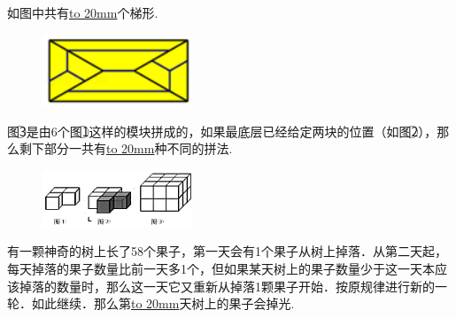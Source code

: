 \item {
    如图中共有\underline{\hbox to 20mm{}}个梯形.
    \begin{figure}[H] 
        \centering
        \includegraphics[width=0.4\textwidth]{./pics/Chapter_6/2016_1.png}
    \end{figure}
}

\item {
    图\textcircled{3}是由6个图\textcircled{1}这样的模块拼成的，如果最底层已经给定两块的位置（如图\textcircled{2}），那么剩下部分一共有\underline{\hbox to 20mm{}}种不同的拼法.
    \begin{figure}[H] 
        \centering
        \includegraphics[width=0.4\textwidth]{./pics/Chapter_6/2016_2.png}
    \end{figure}
}

\item {
    有一颗神奇的树上长了58个果子，第一天会有1个果子从树上掉落．从第二天起，每天掉落的果子数量比前一天多1个，但如果某天树上的果子数量少于这一天本应该掉落的数量时，那么这一天它又重新从掉落1颗果子开始．按原规律进行新的一轮．如此继续．那么第\underline{\hbox to 20mm{}}天树上的果子会掉光.
}


